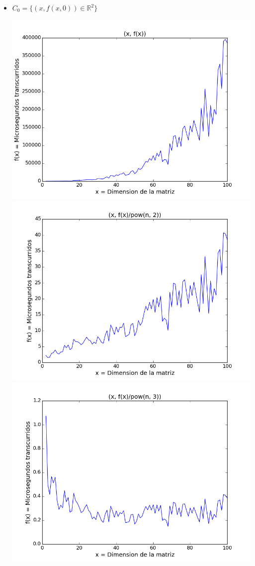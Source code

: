 \begin{itemize}
	
	\item $C_0 = \{ (x, f(x, 0)) \in \mathbb{R}^2 \}$
	\begin{center}
		\includegraphics[scale=0.54]{images/0potenciafuncion}
		\includegraphics[scale=0.54]{images/0potenciasobrecuadrado}
		\includegraphics[scale=0.54]{images/0potenciasobrecubo}
	\end{center}


\end{itemize}
